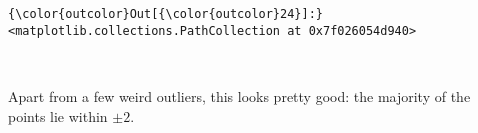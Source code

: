 \documentclass[11pt]{article}
\begin{document}
\begin{Verbatim}[commandchars=\\\{\}]
{\color{outcolor}Out[{\color{outcolor}24}]:} <matplotlib.collections.PathCollection at 0x7f026054d940>
\end{Verbatim}
            
    \begin{center}
    \end{center}
    { \hspace*{\fill} \\}
    
    Apart from a few weird outliers, this looks pretty good: the majority of
the points lie within \(\pm 2\).


    
    
    
    
\end{document}

